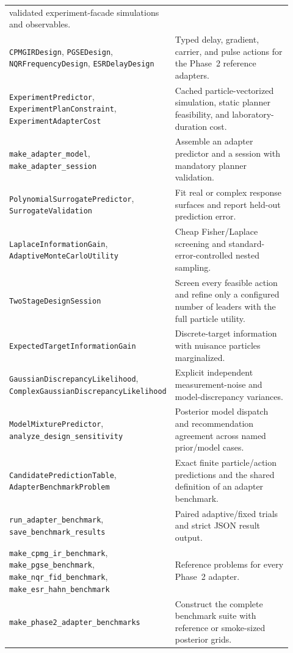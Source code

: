 \documentclass[11pt,oneside]{report}
\newcommand{\code}[1]{\texttt{#1}}
\begin{document}
\begin{longtable}{p{0.35\linewidth}p{0.57\linewidth}}
validated experiment-facade simulations and observables. \\
\code{CPMGIRDesign}, \code{PGSEDesign}, \code{NQRFrequencyDesign},
\code{ESRDelayDesign} & Typed delay, gradient, carrier, and pulse actions for
the Phase~2 reference adapters. \\
\code{ExperimentPredictor}, \code{ExperimentPlanConstraint},
\code{ExperimentAdapterCost} & Cached particle-vectorized simulation, static
planner feasibility, and laboratory-duration cost. \\
\code{make\_adapter\_model}, \code{make\_adapter\_session} & Assemble an
adapter predictor and a session with mandatory planner validation. \\
\code{PolynomialSurrogatePredictor}, \code{SurrogateValidation} & Fit real or
complex response surfaces and report held-out prediction error. \\
\code{LaplaceInformationGain}, \code{AdaptiveMonteCarloUtility} & Cheap
Fisher/Laplace screening and standard-error-controlled nested sampling. \\
\code{TwoStageDesignSession} & Screen every feasible action and refine only a
configured number of leaders with the full particle utility. \\
\code{ExpectedTargetInformationGain} & Discrete-target information with
nuisance particles marginalized. \\
\code{GaussianDiscrepancyLikelihood},
\code{ComplexGaussian}\allowbreak\code{DiscrepancyLikelihood} & Explicit independent
measurement-noise and model-discrepancy variances. \\
\code{ModelMixturePredictor}, \code{analyze\_design\_sensitivity} & Posterior
model dispatch and recommendation agreement across named prior/model cases. \\
\code{CandidatePredictionTable}, \code{AdapterBenchmarkProblem} & Exact finite
particle/action predictions and the shared definition of an adapter benchmark. \\
\code{run\_adapter\_benchmark}, \code{save\_benchmark\_results} & Paired
adaptive/fixed trials and strict JSON result output. \\
\code{make\_cpmg\_ir\_benchmark}, \code{make\_pgse\_benchmark},
\code{make\_nqr\_fid\_benchmark}, \code{make\_esr\_hahn\_benchmark} & Reference
problems for every Phase~2 adapter. \\
\code{make\_phase2\_adapter\_benchmarks} & Construct the complete benchmark
suite with reference or smoke-sized posterior grids. \\

\end{longtable}
\end{document}
